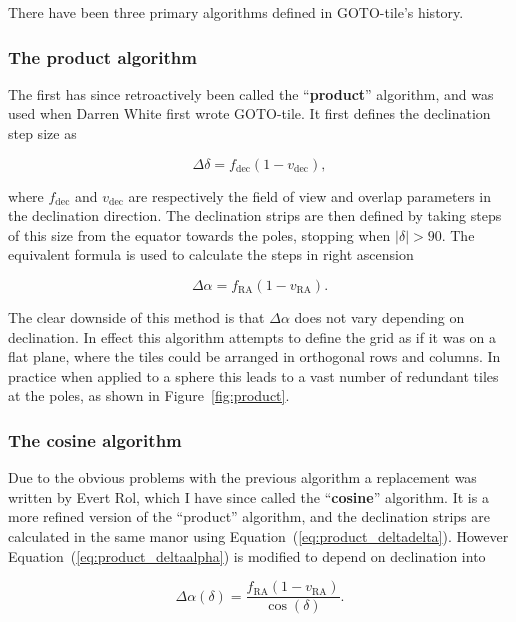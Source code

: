 \begin{colsection}
\begin{colsection}
There have been three primary algorithms defined in GOTO-tile's history.

\subsubsection{The product algorithm}

The first has since retroactively been called the ``\textbf{product}'' algorithm, and was used when Darren White first wrote GOTO-tile. It first defines the declination step size as

\begin{equation}
    \Delta\delta = f_\text{dec}(1-v_\text{dec}),
    \label{eq:product_deltadelta}
\end{equation}

where $f_\text{dec}$ and $v_\text{dec}$ are respectively the field of view and overlap parameters in the declination direction. The declination strips are then defined by taking steps of this size from the equator towards the poles, stopping when $|\delta| > 90$. The equivalent formula is used to calculate the steps in right ascension

\begin{equation}
    \Delta\alpha = f_\text{RA}(1-v_\text{RA}).
    \label{eq:product_deltaalpha}
\end{equation}

The clear downside of this method is that $\Delta\alpha$ does not vary depending on declination. In effect this algorithm attempts to define the grid as if it was on a flat plane, where the tiles could be arranged in orthogonal rows and columns. In practice when applied to a sphere this leads to a vast number of redundant tiles at the poles, as shown in Figure~\ref{fig:product}.

\subsubsection{The cosine algorithm}

Due to the obvious problems with the previous algorithm a replacement was written by Evert Rol, which I have since called the ``\textbf{cosine}'' algorithm. It is a more refined version of the ``product'' algorithm, and the declination strips are calculated in the same manor using Equation~(\ref{eq:product_deltadelta}). However Equation~(\ref{eq:product_deltaalpha}) is modified to depend on declination into

\begin{equation}
    \Delta\alpha(\delta) = \frac{f_\text{RA}(1-v_\text{RA})}{\cos(\delta)}.
    \label{eq:cosine_deltaalpha}
\end{equation}


\end{colsection}
\end{colsection}
